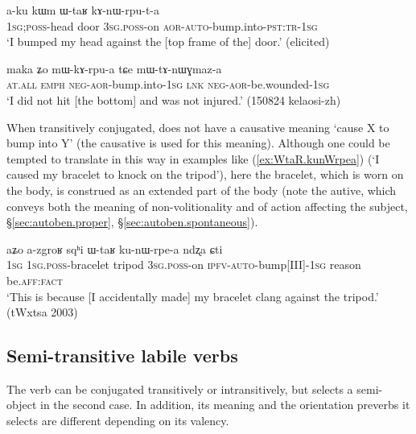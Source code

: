  \begin{exe}
\ex \label{ex:WtaR.kAnWrputa}
\gll  a-ku kɯm ɯ-taʁ kɤ-nɯ-rpu-t-a \\
\textsc{1sg};\textsc{poss}-head door \textsc{3sg}.\textsc{poss}-on \textsc{aor}-\textsc{auto}-bump.into-\textsc{pst}:\textsc{tr}-\textsc{1sg} \\
\glt  `I bumped my head against the [top frame of the] door.' (elicited)
\end{exe}

 \begin{exe}
\ex \label{ex:kArpua}
\gll maka ʑo mɯ-kɤ-rpu-a tɕe mɯ-tɤ-nɯɣmaz-a \\
\textsc{at}.\textsc{all} \textsc{emph} \textsc{neg}-\textsc{aor}-bump.into-\textsc{1sg} \textsc{lnk} \textsc{neg}-\textsc{aor}-be.wounded-\textsc{1sg} \\
\glt  `I did not hit [the bottom] and was not injured.' (150824 kelaosi-zh)
\end{exe}

When transitively conjugated,  does not have a causative meaning `cause X to bump into Y' (the causative  is used for this meaning). Although one could be tempted to translate  in this way in examples like (\ref{ex:WtaR.kunWrpea}) (`I caused my bracelet to knock on the tripod'), here the bracelet, which is worn on the body, is construed as an extended part of the body (note the autive, which conveys both the meaning of non-volitionality and of action affecting the subject, §\ref{sec:autoben.proper}, §\ref{sec:autoben.spontaneous}).

 \begin{exe}
\ex \label{ex:WtaR.kunWrpea}
\gll   aʑo a-zgroʁ sqʰi ɯ-taʁ ku-nɯ-rpe-a ndʐa ɕti \\
\textsc{1sg} \textsc{1sg}.\textsc{poss}-bracelet tripod \textsc{3sg}.\textsc{poss}-on \textsc{ipfv}-\textsc{auto}-bump[III]-\textsc{1sg} reason be.\textsc{aff}:\textsc{fact} \\
\glt `This is because [I accidentally made] my bracelet clang against the tripod.' (tWxtsa 2003)
\end{exe}

\subsection{Semi-transitive labile verbs}\label{sec:semi.tr.labile}
The verb  can be conjugated transitively or intransitively, but selects a semi-object in the second case. In addition, its meaning and the orientation preverbs it selects are different depending on its valency.


